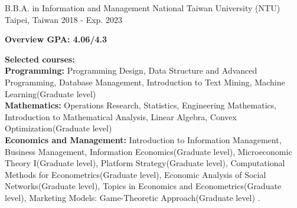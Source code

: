 

\begin{cventries}

  \cventry
    {B.B.A. in Information and Management} %
    {National Taiwan University (NTU)} %
    {Taipei, Taiwan} %
    {2018 - Exp. 2023} %
    {
      \begin{cvitems} %
        \item {\textbf{Overview GPA: 4.06/4.3}}
        \item {\textbf{Selected courses:} \\
                \textbf{Programming:}
                Programming Design,
                Data Structure and Advanced Programming,
                Database Management,
                Introduction to Text Mining,
                Machine Learning(Graduate level)\\
                \textbf{Mathematics:}
                Operations Research,
                Statistics,
                Engineering Mathematics,
                Introduction to Mathematical Analysis,
                Linear Algebra,
                Convex Optimization(Graduate level) \\
                \textbf{Economics and Management:}
                Introduction to Information Management,
                Business Management,
                Information Economics(Graduate level),
                Microeconomic Theory I(Graduate level),
                Platform Strategy(Graduate level),
                Computational Methods for Econometrics(Graduate level),
                Economic Analysis of Social Networks(Graduate level),
                Topics in Economics and Econometrics(Graduate level),
                Marketing Models: Game-Theoretic Approach(Graduate level)
            .}
      \end{cvitems}
    }

\end{cventries}

